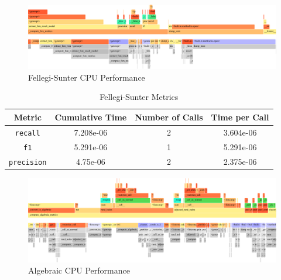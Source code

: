 \documentclass{article}
\begin{document}
    \begin{figure}[htbp]
        \centering
        \includegraphics[width=\textwidth]{performance/fs-flamegraph}
        \caption{Fellegi-Sunter CPU Performance}\label{appendix:fig:fs-cpu-perf}
    \end{figure}

    \begin{table}[htbp]
        \centering
        \begin{tabular}{c c c c}
            \toprule
            Metric & Cumulative Time & Number of Calls & Time per Call \\ [0.5ex]
            \toprule
            \texttt{recall} & 7.208e-06 & 2 & 3.604e-06 \\
            \midrule
            \texttt{f1} & 5.291e-06 & 1 & 5.291e-06 \\
            \midrule
            \texttt{precision} & 4.75e-06 & 2 & 2.375e-06 \\
            \bottomrule
        \end{tabular}
        \caption{Fellegi-Sunter Metrics}\label{appendix:table:fs-cpu-perf}
    \end{table}

    \begin{figure}[htbp]
        \includegraphics[width=\textwidth]{performance/algebraic-flamegraph}
        \caption{Algebraic CPU Performance}\label{appendix:fig:alg-cpu-perf}
    \end{figure}
\end{document}
